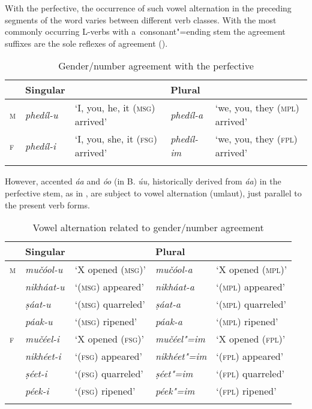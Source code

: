With the perfective, the occurrence of such vowel alternation in the preceding segments of the word varies between different verb classes. With the most commonly occurring L-verbs with a~consonant"=ending stem the agreement suffixes are the sole reflexes of agreement ().


\begin{table}[ht]
\caption{Gender/number agreement with the perfective}

\begin{tabularx}{\textwidth}{ l l Q l Q }
\lsptoprule
&
Singular &
&
Plural &
\\\hline
\textsc{m} &
\textit{phedíl-u} &
`I, you, he, it (\textsc{msg}) arrived' &
\textit{phedíl-a} &
`we, you, they (\textsc{mpl}) arrived'\\
\textsc{f} &
\textit{phedíl-i} &
`I, you, she, it (\textsc{fsg}) arrived' &
\textit{phedíl-im} &
`we, you, they (\textsc{fpl}) arrived'\\\lspbottomrule
\end{tabularx}
\label{tab:8-19}
\end{table}


However, accented \textit{áa} and \textit{óo} (in B. \textit{úu,} historically derived from \textit{áa}) in the perfective stem, as in , are subject to vowel alternation (umlaut), just parallel to the present verb forms. 


\begin{table}[ht]
\caption{Vowel alternation related to gender/number agreement}

\begin{tabularx}{\textwidth}{ l l@{\hspace{20pt}} l@{\hspace{20pt}} l@{\hspace{20pt}} l@{\hspace{20pt}} }
\lsptoprule
&
Singular &
&
Plural &
\\\hline
\textsc{m} &
\textit{mučóol-u} &
`X opened (\textsc{msg})' &
\textit{mučóol-a} &
`X opened (\textsc{mpl})'\\
&
\textit{nikháat-u} &
`(\textsc{msg}) appeared' &
\textit{nikháat-a} &
`(\textsc{mpl}) appeared'\\
&
\textit{ṣáat-u} &
`(\textsc{msg}) quarreled' &
\textit{ṣáat-a} &
`(\textsc{mpl}) quarreled'\\
&
\textit{páak-u} &
`(\textsc{msg}) ripened' &
\textit{páak-a} &
`(\textsc{mpl}) ripened'\\
\textsc{f} &
\textit{mučéel-i} &
`X opened (\textsc{fsg})' &
\textit{mučéel"=im} &
`X opened (\textsc{fpl})'\\
&
\textit{nikhéet-i} &
`(\textsc{fsg}) appeared' &
\textit{nikhéet"=im} &
`(\textsc{fpl}) appeared'\\
&
\textit{ṣéet-i} &
`(\textsc{fsg}) quarreled' &
\textit{ṣéet"=im} &
`(\textsc{fpl}) quarreled'\\
&
\textit{péek-i} &
`(\textsc{fsg}) ripened' &
\textit{péek"=im} &
`(\textsc{fpl}) ripened'\\\lspbottomrule
\end{tabularx}
\label{tab:8-20}
\end{table}


